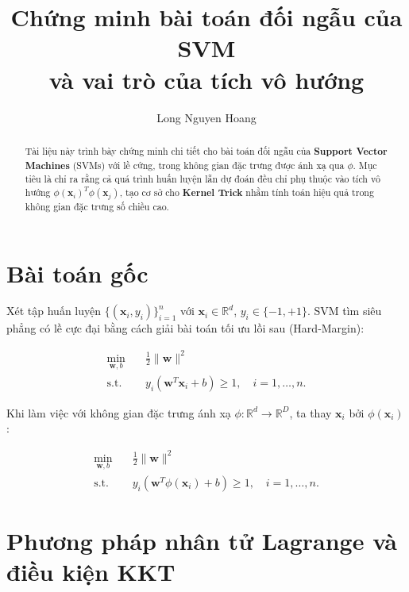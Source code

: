 \documentclass[12pt,a4paper]{article}
\title{\bfseries Chứng minh bài toán đối ngẫu của SVM \\ và vai trò của tích vô hướng}
\author{Long Nguyen Hoang}
\date{ }
\theoremstyle{definition}
\theoremstyle{remark}
\begin{document}
\maketitle

\begin{abstract}
Tài liệu này trình bày chứng minh chi tiết cho bài toán đối ngẫu của \textbf{Support Vector Machines} (SVMs) với lề cứng, trong không gian đặc trưng được ánh xạ qua $\phi$. Mục tiêu là chỉ ra rằng cả quá trình huấn luyện lẫn dự đoán đều chỉ phụ thuộc vào tích vô hướng $\phi(\mathbf{x}_i)^T \phi(\mathbf{x}_j)$, tạo cơ sở cho \textbf{Kernel Trick} nhằm tính toán hiệu quả trong không gian đặc trưng số chiều cao.
\end{abstract}

\tableofcontents
\newpage
\section{Bài toán gốc}

Xét tập huấn luyện $\{(\mathbf{x}_i, y_i)\}_{i=1}^n$ với $\mathbf{x}_i \in \mathbb{R}^d$, $y_i \in \{-1, +1\}$. SVM tìm siêu phẳng có lề cực đại bằng cách giải bài toán tối ưu lồi sau (Hard‑Margin):

\begin{equation}\label{eq:primal}
\begin{aligned}
\min_{\mathbf{w}, b} \quad & \frac{1}{2}\|\mathbf{w}\|^2 \\
\text{s.t.} \quad & y_i(\mathbf{w}^T \mathbf{x}_i + b) \ge 1, \quad i = 1,\dots, n.
\end{aligned}
\end{equation}

Khi làm việc với không gian đặc trưng ánh xạ $\phi: \mathbb{R}^d \to \mathbb{R}^D$, ta thay $\mathbf{x}_i$ bởi $\phi(\mathbf{x}_i)$:

\begin{equation}\label{eq:primal_phi}
\begin{aligned}
\min_{\mathbf{w}, b} \quad & \frac{1}{2}\|\mathbf{w}\|^2 \\
\text{s.t.} \quad & y_i(\mathbf{w}^T \phi(\mathbf{x}_i) + b) \ge 1, \quad i = 1,\dots, n.
\end{aligned}
\end{equation}

\section{Phương pháp nhân tử Lagrange và điều kiện KKT}
\end{document}
